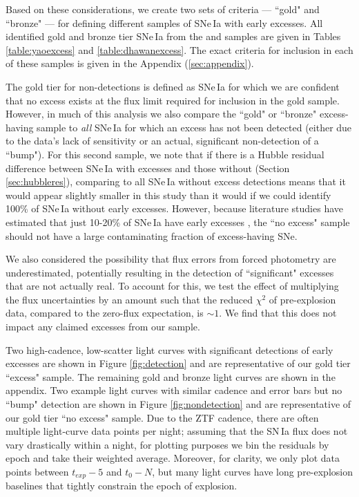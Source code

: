 \documentclass[twocolumn,twocolappendix, linenumbers]{aastex631} %
\begin{document}
Based on these considerations, we create two sets of criteria --- ``gold" and ``bronze" --- for defining different samples of SNe\,Ia with early excesses.  All identified gold and bronze tier SNe\,Ia from the \citet{Yao19} and \citet{Dhawan22} samples are given in Tables \ref{table:yaoexcess} and \ref{table:dhawanexcess}.  The exact criteria for inclusion in each of these samples is given in the Appendix (\ref{sec:appendix}).

The gold tier for non-detections is defined as SNe\,Ia for which we are confident that no excess exists at the flux limit required for inclusion in the gold sample.  However, in much of this analysis we also compare the ``gold" or ``bronze" excess-having sample to {\it all} SNe\,Ia for which an excess has not been detected (either due to the data's lack of sensitivity or an actual, significant non-detection of a ``bump").  
For this second sample, we note that if there is a Hubble residual difference between SNe\,Ia with excesses and those without (Section \ref{sec:hubbleres}), comparing to all SNe\,Ia without excess detections means that it would appear slightly smaller in this study than it would if we could identify 100\% of SNe\,Ia without early excesses.
However, because literature studies have estimated that just 10-20\% of SNe\,Ia have early excesses \citep[e.g.,][]{Burke22b}, the ``no excess" sample should not have a large contaminating fraction of excess-having SNe.  %

We also considered the possibility that flux errors from forced photometry are underestimated, potentially resulting in the detection of ``significant" excesses that are not actually real. To account for this, we test the effect of multiplying the flux uncertainties by an amount such that the reduced $\chi^2$ of pre-explosion data, compared to the zero-flux expectation, is $\sim 1$. We find that this does not impact any claimed excesses from our sample.


Two high-cadence, low-scatter light curves with significant detections of early excesses are shown in Figure \ref{fig:detection} and are representative of our gold tier ``excess" sample. The remaining gold and bronze light curves are shown in the appendix.  Two example light curves with similar cadence and error bars but no ``bump" detection are shown in Figure \ref{fig:nondetection} and are representative of our gold tier ``no excess" sample. Due to the ZTF cadence, there are often multiple light-curve data points per night; assuming that the SN\,Ia flux does not vary drastically within a night, for plotting purposes we bin the residuals by epoch and take their weighted average. Moreover, for clarity, we only plot data points between $t_{exp} - 5$ and $t_0 - N$, but many light curves have long pre-explosion baselines that tightly constrain the epoch of explosion.
\end{document}
